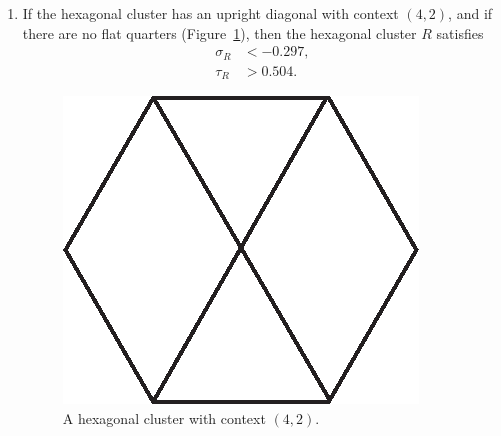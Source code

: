 \begin{enumerate}
\item\label{app:hex5} If the hexagonal cluster has an upright
diagonal with context $(4,2)$, and if there are no flat quarters
(Figure~\ref{fig:hex42}), then the hexagonal cluster $R$ satisfies
    $$
    \begin{array}{lll}
    \sigma_R &< -0.297,\\
    \tau_R &> 0.504.
    \end{array}
    $$
\begin{figure}[htb]
  \centering
  \includegraphics{PS/hex42.eps}
  \caption{A hexagonal cluster with context $(4,2)$.}
  \label{fig:hex42}
\end{figure}


\end{enumerate}
